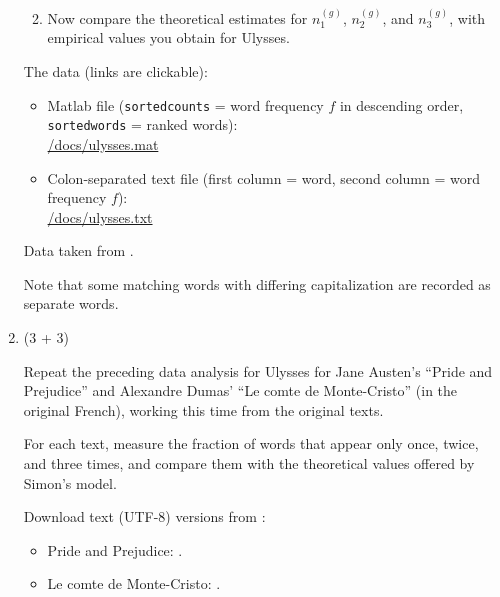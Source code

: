 \begin{enumerate}
\begin{enumerate}

         
   \solutionstart


   \solutionend
         

       \item
         Now compare the theoretical estimates
         for $n^{(g)}_1$, $n^{(g)}_2$, and $n^{(g)}_3$,
         with empirical values you obtain for Ulysses.

         
   \solutionstart


   \solutionend

       \end{enumerate}

       The data (links are clickable):
       \begin{itemize}
       \item 
         Matlab file (\texttt{sortedcounts} = word frequency $f$ in descending order, \texttt{sortedwords} = ranked words):\\
         \href{\coursewebsite/docs/ulysses.mat}{\coursewebsitetext/docs/ulysses.mat}
       \item
         Colon-separated text file (first column = word, second column = word frequency $f$):\\
         \href{\coursewebsite/docs/ulysses.txt}{\coursewebsitetext/docs/ulysses.txt}
       \end{itemize}

       Data taken from
       .
       
       Note that some matching words with differing capitalization are recorded as separate words.

     \item (3 + 3)

       Repeat the preceding data analysis for Ulysses for Jane Austen's ``Pride
       and Prejudice'' and Alexandre Dumas' ``Le comte de Monte-Cristo'' (in
       the original French), working this time from the original texts.

       For each text, measure the fraction of words that appear only once, twice, and three times,
       and compare them with the theoretical values offered by Simon's model.
       
       Download text (UTF-8) versions from :
       \begin{itemize}
       \item
         Pride and Prejudice:
         .
       \item
         Le comte de Monte-Cristo:
         .
       \end{itemize}


\end{enumerate}
